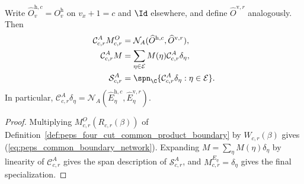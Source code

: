 \begin{lemma}%
    \label{thm:peps_four_cut_common_boundary_span}
    \leanok
    Write $\widehat O^{\mathrm h,c}_v=O^{\mathrm h}_v$ on $v_x+1=c$ and $\Id$
    elsewhere, and define $\widehat O^{\mathrm v,r}$ analogously. Then
    \begin{align}
        \mathcal C^A_{c,r}M^O_{c,r}
         & =\mathcal N_A(\widehat O^{\mathrm h,c},\widehat O^{\mathrm v,r}),
        \label{eq:peps_common_boundary_network}                              \\
        \mathcal C^A_{c,r}M
         & =\sum_{\eta\in\mathcal E}M(\eta)\mathcal C^A_{c,r}\delta_\eta,
        \notag                                                               \\
        \mathcal S^A_{c,r}
         & =\spn_{\C}\{\mathcal C^A_{c,r}\delta_\eta:\eta\in\mathcal E\}.
        \notag
    \end{align}
    In particular, $\mathcal C^A_{c,r}\delta_\eta=\mathcal N_A(\widehat E^{\mathrm h,c}_\eta,\widehat E^{\mathrm v,r}_\eta)$.
\end{lemma}
\begin{proof}\leanok
    Multiplying $M^O_{c,r}(R_{c,r}(\beta))$ of
    Definition~\ref{def:peps_four_cut_common_product_boundary} by $W_{c,r}(\beta)$
    gives (\ref{eq:peps_common_boundary_network}). Expanding
    $M=\sum_\eta M(\eta)\delta_\eta$ by linearity of $\mathcal C^A_{c,r}$ gives
    the span description of $\mathcal S^A_{c,r}$, and $M^{E_\eta}_{c,r}=\delta_\eta$
    gives the final specialization.
\end{proof}

